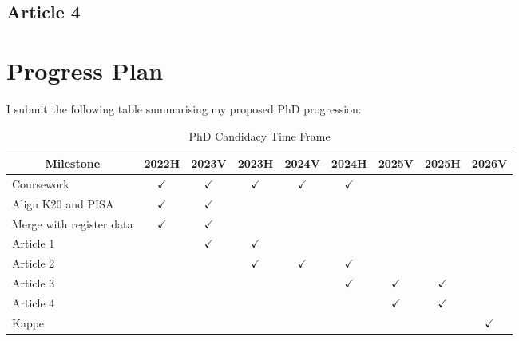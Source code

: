 \documentclass[
    a4paper,                %
    11pt,                   %
    stu,                    %
    donotrepeattitle,       %
    floatsintext,           %
    biblatex,               %
    colorlinks=true,        %
    linkcolor=red,          %
    anchorcolor=black,      %
    citecolor=blue,         %
    urlcolor=blue,          %
    bookmarks=true,         %
    bookmarksopen=false,    %
    bookmarksnumbered=true, %
    dvipsnames              %
]{apa7}
\begin{document}
\subsection{Article 4}

\section{Progress Plan}

I submit the following table summarising my proposed PhD progression:

\begin{table}[htbp]
    \begin{threeparttable}
    \caption{PhD Candidacy Time Frame}
    \label{tab:timeframe}
    \begin{tabular}{lcccccccc}
        \toprule
        \multicolumn{1}{c}{Milestone} & 2022H & 2023V & 2023H & 2024V & 2024H & 2025V & 2025H & 2026V \\
        \midrule
        Coursework & $\checkmark$     & $\checkmark$     & $\checkmark$     & $\checkmark$      & $\checkmark$      &       &       &  \\
        Align K20 and PISA & $\checkmark$     & $\checkmark$       &       &       &       &       &       &  \\
        Merge with register data & $\checkmark$     & $\checkmark$     &       &       &       &       &       &  \\
        Article 1 &       & $\checkmark$     & $\checkmark$     &       &       &       &       &  \\
        Article 2 &       &       & $\checkmark$     & $\checkmark$     & $\checkmark$     &       &       &  \\
        Article 3 &       &       &       &       & $\checkmark$     & $\checkmark$     & $\checkmark$     &  \\
        Article 4 &       &       &       &       &       & $\checkmark$     & $\checkmark$     &  \\
        Kappe &       &       &       &       &       &       &       & $\checkmark$ \\
        \bottomrule
        \end{tabular}
    \end{threeparttable}
\end{table}

\printbibliography
\end{document}
